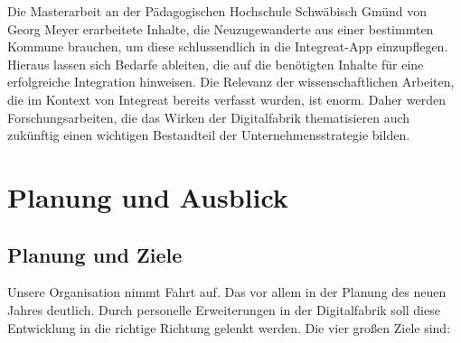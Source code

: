 \documentclass[12pt, a4paper]{article} %
\begin{document}
Die Masterarbeit an der Pädagogischen Hochschule Schwäbisch Gmünd von
Georg Meyer erarbeitete Inhalte, die Neuzugewanderte aus einer
bestimmten Kommune brauchen, um diese schlussendlich in die
Integreat-App einzupflegen. Hieraus lassen sich Bedarfe ableiten, die
auf die benötigten Inhalte für eine erfolgreiche Integration hinweisen.
Die Relevanz der wissenschaftlichen Arbeiten, die im Kontext von
Integreat bereits verfasst wurden, ist enorm. Daher werden
Forschungsarbeiten, die das Wirken der Digitalfabrik thematisieren auch
zukünftig einen wichtigen Bestandteil der Unternehmensstrategie bilden.

\hypertarget{planung-und-ausblick}{%
\section{Planung und Ausblick}\label{planung-und-ausblick}}

\hypertarget{planung-und-ziele}{%
\subsection{Planung und Ziele}\label{planung-und-ziele}}

Unsere Organisation nimmt Fahrt auf. Das vor allem in der Planung des
neuen Jahres deutlich. Durch personelle Erweiterungen in der
Digitalfabrik soll diese Entwicklung in die richtige Richtung gelenkt
werden. Die vier großen Ziele sind:
\end{document}
